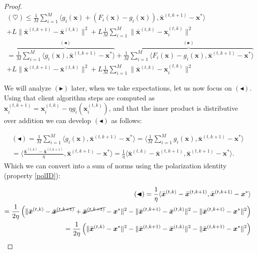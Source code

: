 \begin{proof}
\begin{align*}
    (\heartsuit) \leq \frac{1}{M} \sum_{i=1}^M  \langle g_i(\bm{x})  + \left(F_i(\bm{x}) - g_i(\bm{x}) \right) ,\bar{\bm{x}}^{(t,k+1)} - \bm{x}^{*} \rangle  \\+ L  \|\bar{\bm{x}}^{(t,k+1)}-\bar{\bm{x}}^{(t,k)} \|^2  +L \frac{1}{M} \sum_{i=1}^M \|\bar{\bm{x}}^{(t,k)}-\bm{x}_i^{(t,k)} \|^2 \\
    = \overbrace{\frac{1}{M} \sum_{i=1}^M  \langle g_i(\bm{x})  ,\bar{\bm{x}}^{(t,k+1)} - \bm{x}^{*} \rangle  }^{(\blacktriangleleft)}
    + \overbrace{\frac{1}{M} \sum_{i=1}^M  \langle F_i(\bm{x}) - g_i(\bm{x})  ,\bar{\bm{x}}^{(t,k+1)} - \bm{x}^{*} \rangle  }^{(\blacktriangleright)}
    \\+ L  \|\bar{\bm{x}}^{(t,k+1)}-\bar{\bm{x}}^{(t,k)} \|^2  +L \frac{1}{M} \sum_{i=1}^M \|\bar{\bm{x}}^{(t,k)}-\bm{x}_i^{(t,k)} \|^2 
\end{align*}

We will analyze $(\blacktriangleright)$ later, when we take expectations, let us now focus on $(\blacktriangleleft)$. Using that client algorithm steps are computed as $\bm{x}_i^{(t,k+1)} = \bm{x}_i^{(t,k)} - \eta g_i(\bm{x}_i^{(t,k)})$, and that the inner product is distributive over addition we can develop $(\blacktriangleleft)$ as follows:

\begin{align*}
    (\blacktriangleleft) = \frac{1}{M} \sum_{i=1}^M  \langle g_i(\bm{x})  ,\bar{\bm{x}}^{(t,k+1)} - \bm{x}^{*} \rangle =  \langle \frac{1}{M} \sum_{i=1}^M  g_i(\bm{x})  ,\bar{\bm{x}}^{(t,k+1)} - \bm{x}^{*} \rangle \\
    =  \Bigg\langle \frac{\bar{\bm{x}}^{(t,k)} - \bar{\bm{x}}^{(t,k+1)}}{\eta},\bar{\bm{x}}^{(t,k+1)} - \bm{x}^{*} \Bigg\rangle = \frac{1}{\eta} \langle \bar{\bm{x}}^{(t,k)} - \bar{\bm{x}}^{(t,k+1)}  ,\bar{\bm{x}}^{(t,k+1)} - \bm{x}^{*} \rangle.
\end{align*}
\noindent
Which we can convert into a sum of norms using the polarization identity (property \ref{polID}):

\begin{align*}
    (\blacktriangleleft) = \frac{1}{\eta} \langle \bar{\bm{x}}^{(t,k)} - \bar{\bm{x}}^{(t,k+1)} ,\bar{\bm{x}}^{(t,k+1)} - \bm{x}^{*} \rangle \\
    = \frac{1}{2\eta} \left(\|  \bar{\bm{x}}^{(t,k)} - \cancel{\bar{\bm{x}}^{(t,k+1)}} + \cancel{\bar{\bm{x}}^{(t,k+1)}} - \bm{x}^{*} \|^2 - \|  \bar{\bm{x}}^{(t,k+1)} - \bar{\bm{x}}^{(t,k)} \|^2 - \| \bar{\bm{x}}^{(t,k+1)} - \bm{x}^{*} \|^2\right) \\
    = \frac{1}{2\eta} \left(\|  \bar{\bm{x}}^{(t,k)} - \bm{x}^{*} \|^2 - \|  \bar{\bm{x}}^{(t,k+1)} - \bar{\bm{x}}^{(t,k)} \|^2 - \| \bar{\bm{x}}^{(t,k+1)} - \bm{x}^{*} \|^2 \right)
\end{align*}


\end{proof}
